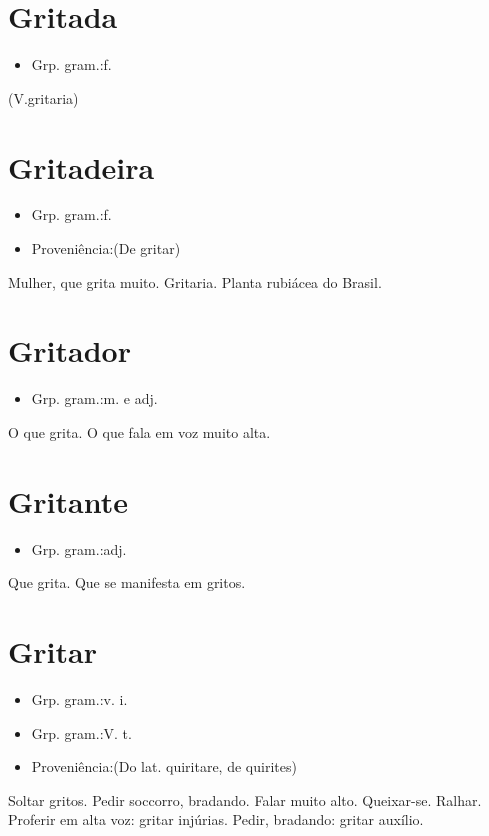 \section{Gritada}
\begin{itemize}
\item {Grp. gram.:f.}
\end{itemize}
(V.gritaria)
\section{Gritadeira}
\begin{itemize}
\item {Grp. gram.:f.}
\end{itemize}
\begin{itemize}
\item {Proveniência:(De \textunderscore gritar\textunderscore )}
\end{itemize}
Mulher, que grita muito.
Gritaria.
Planta rubiácea do Brasil.
\section{Gritador}
\begin{itemize}
\item {Grp. gram.:m.  e  adj.}
\end{itemize}
O que grita.
O que fala em voz muito alta.
\section{Gritante}
\begin{itemize}
\item {Grp. gram.:adj.}
\end{itemize}
Que grita.
Que se manifesta em gritos.
\section{Gritar}
\begin{itemize}
\item {Grp. gram.:v. i.}
\end{itemize}
\begin{itemize}
\item {Grp. gram.:V. t.}
\end{itemize}
\begin{itemize}
\item {Proveniência:(Do lat. \textunderscore quiritare\textunderscore , de \textunderscore quirites\textunderscore )}
\end{itemize}
Soltar gritos.
Pedir soccorro, bradando.
Falar muito alto.
Queixar-se.
Ralhar.
Proferir em alta voz: \textunderscore gritar injúrias\textunderscore .
Pedir, bradando: \textunderscore gritar auxílio\textunderscore .
